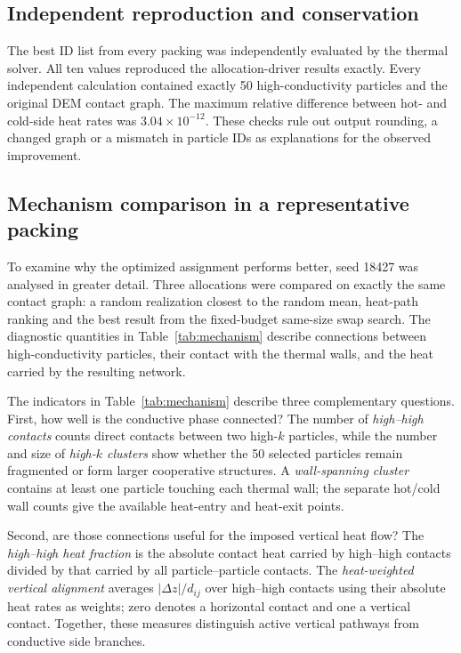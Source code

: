 \documentclass[12pt,a4paper]{article}
\begin{document}
	\subsection{Independent reproduction and conservation}
	
	The best ID list from every packing was independently evaluated by the thermal
	solver. All ten values reproduced the allocation-driver results exactly. Every
	independent calculation contained exactly 50 high-conductivity particles and
	the original DEM contact graph. The maximum relative difference between hot-
	and cold-side heat rates was $3.04\times10^{-12}$. These checks rule out output
	rounding, a changed graph or a mismatch in particle IDs as explanations for the
	observed improvement.
	
	\subsection{Mechanism comparison in a representative packing}
	
	To examine why the optimized assignment performs better, seed 18427 was
	analysed in greater detail. Three allocations were compared on exactly the same
	contact graph: a random realization closest to the random mean, heat-path
	ranking and the best result from the fixed-budget same-size swap search. The diagnostic quantities
	in Table~\ref{tab:mechanism} describe connections between high-conductivity
	particles, their contact with the thermal walls, and the heat carried by the
	resulting network.
	
	The indicators in Table~\ref{tab:mechanism} describe three complementary
	questions. First, how well is the conductive phase connected? The number of
	\emph{high--high contacts} counts direct contacts between two high-$k$ particles,
	while the number and size of \emph{high-$k$ clusters} show whether the 50 selected
	particles remain fragmented or form larger cooperative structures. A
	\emph{wall-spanning cluster} contains at least one particle touching each thermal
	wall; the separate hot/cold wall counts give the available heat-entry and
	heat-exit points.
	
	Second, are those connections useful for the imposed vertical heat flow? The
	\emph{high--high heat fraction} is the absolute contact heat carried by
	high--high contacts divided by that carried by all particle--particle contacts.
	The \emph{heat-weighted vertical alignment} averages $|\Delta z|/d_{ij}$ over
	high--high contacts using their absolute heat rates as weights; zero denotes a
	horizontal contact and one a vertical contact. Together, these measures
	distinguish active vertical pathways from conductive side branches.
	
\end{document}
